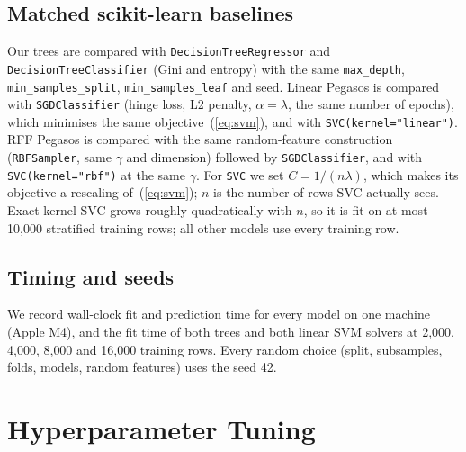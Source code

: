 \documentclass[10pt,twocolumn,a4paper]{article}
\begin{document}
\subsection{Matched scikit-learn baselines}
Our trees are compared with \texttt{DecisionTreeRegressor} and
\texttt{DecisionTreeClassifier} (Gini and entropy) with the same
\texttt{max\_depth}, \texttt{min\_samples\_split},
\texttt{min\_samples\_leaf} and seed. Linear Pegasos is compared with
\texttt{SGDClassifier} (hinge loss, L2 penalty, $\alpha = \lambda$, the
same number of epochs), which minimises the same objective~(\ref{eq:svm}),
and with \texttt{SVC(kernel="linear")}. RFF Pegasos is compared with the
same random-feature construction (\texttt{RBFSampler}, same $\gamma$ and
dimension) followed by \texttt{SGDClassifier}, and with
\texttt{SVC(kernel="rbf")} at the same $\gamma$. %
For \texttt{SVC} we set $C = 1/(n\lambda)$, which makes its objective a
rescaling of~(\ref{eq:svm}); $n$ is the number of rows SVC actually sees. %
Exact-kernel SVC grows roughly quadratically with $n$, so it is fit on at
most 10{,}000 stratified training rows; %
all other models use every training row.

\subsection{Timing and seeds}
We record wall-clock fit and prediction time for every model on one
machine (Apple M4), and the fit time of both trees and both linear SVM
solvers at 2{,}000, 4{,}000, 8{,}000 and 16{,}000 training rows. %
Every random choice (split, subsamples, folds, models, random features)
uses the seed 42. %

\section{Hyperparameter Tuning}
\label{sec:tuning}
\end{document}
